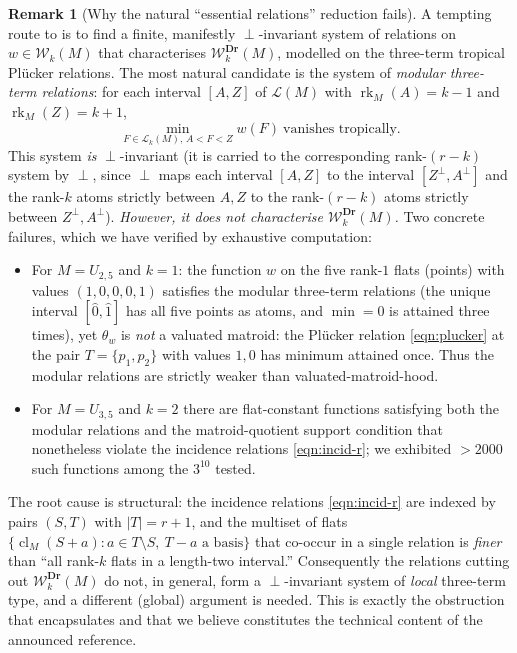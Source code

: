 \documentclass{article}
\theoremstyle{definition}
\newtheorem{remark}[theorem]{Remark}
\newcommand{\rk}{\operatorname{rk}}
\newcommand{\cl}{\operatorname{cl}}
\newcommand{\Dr}{\mathbf{Dr}}
\newcommand{\cLL}{\mathcal{L}}
\newcommand{\cW}{\mathcal{W}}
\begin{document}
\begin{remark}[Why the natural ``essential relations'' reduction fails]\label{rmk:false-reduction}
A tempting route to  is to find a finite, manifestly $\perp$-invariant
system of relations on $w\in\cW_k(M)$ that characterises $\cW^{\Dr}_k(M)$, modelled on the
three-term tropical Pl\"ucker relations. The most natural candidate is the system of
\emph{modular three-term relations}: for each interval $[A,Z]$ of $\cLL(M)$ with $\rk_M(A)=k-1$ and
$\rk_M(Z)=k+1$,
\[
  \min_{F\in\cLL_k(M),\,A<F<Z} w(F)\ \text{vanishes tropically.}
\]
This system \emph{is} $\perp$-invariant (it is carried to the corresponding rank-$(r-k)$ system by
$\perp$, since $\perp$ maps each interval $[A,Z]$ to the interval $[Z^{\perp},A^{\perp}]$ and the
rank-$k$ atoms strictly between $A,Z$ to the rank-$(r-k)$ atoms strictly between $Z^{\perp},A^{\perp}$).
\emph{However, it does not characterise $\cW^{\Dr}_k(M)$.} Two concrete failures, which we have
verified by exhaustive computation:
\begin{itemize}
\item For $M=U_{2,5}$ and $k=1$: the function $w$ on the five rank-$1$ flats (points) with values
$(1,0,0,0,1)$ satisfies the modular three-term relations (the unique interval $[\hat0,\hat1]$ has all
five points as atoms, and $\min=0$ is attained three times), yet $\theta_w$ is \emph{not} a valuated
matroid: the Pl\"ucker relation \eqref{eqn:plucker} at the pair $T=\{p_1,p_2\}$ with values $1,0$ has
minimum attained once. Thus the modular relations are strictly weaker than valuated-matroid-hood.
\item For $M=U_{3,5}$ and $k=2$ there are flat-constant functions satisfying both the modular
relations and the matroid-quotient support condition that nonetheless violate the incidence relations
\eqref{eqn:incid-r}; we exhibited $>2000$ such functions among the $3^{10}$ tested.
\end{itemize}
The root cause is structural: the incidence relations \eqref{eqn:incid-r} are indexed by pairs
$(S,T)$ with $|T|=r+1$, and the multiset of flats $\{\cl_M(S+a):a\in T\setminus S,\ T-a\text{ a
basis}\}$ that co-occur in a single relation is \emph{finer} than ``all rank-$k$ flats in a
length-two interval.'' Consequently the relations cutting out $\cW^{\Dr}_k(M)$ do not, in general,
form a $\perp$-invariant system of \emph{local} three-term type, and a different (global) argument is
needed. This is exactly the obstruction that  encapsulates and that we
believe constitutes the technical content of the announced reference.
\end{remark}
\end{document}
